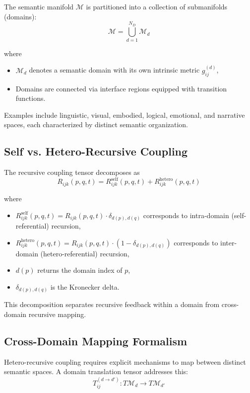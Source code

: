 The semantic manifold \(\mathcal{M}\) is partitioned into a collection of submanifolds (domains):
\begin{equation}
\mathcal{M} = \bigcup_{d=1}^{N_D} \mathcal{M}_d
\end{equation}

where
\begin{itemize}
    \item \(\mathcal{M}_d\) denotes a semantic domain with its own intrinsic metric \(g_{ij}^{(d)}\),
    \item Domains are connected via interface regions equipped with transition functions.
\end{itemize}

Examples include linguistic, visual, embodied, logical, emotional, and narrative spaces, each characterized by distinct semantic organization.

\subsection{Self vs. Hetero-Recursive Coupling}

The recursive coupling tensor decomposes as
\begin{equation}
R_{ijk}(p, q, t) = R_{ijk}^{\text{self}}(p, q, t) + R_{ijk}^{\text{hetero}}(p, q, t)
\end{equation}

where
\begin{itemize}
    \item \(R_{ijk}^{\text{self}}(p, q, t) = R_{ijk}(p, q, t) \cdot \delta_{d(p),d(q)}\) corresponds to intra-domain (self-referential) recursion,
    \item \(R_{ijk}^{\text{hetero}}(p, q, t) = R_{ijk}(p, q, t) \cdot (1 - \delta_{d(p),d(q)})\) corresponds to inter-domain (hetero-referential) recursion,
    \item \(d(p)\) returns the domain index of \(p\),
    \item \(\delta_{d(p),d(q)}\) is the Kronecker delta.
\end{itemize}

This decomposition separates recursive feedback within a domain from cross-domain recursive mapping.

\subsection{Cross-Domain Mapping Formalism}

Hetero-recursive coupling requires explicit mechanisms to map between distinct semantic spaces. A domain translation tensor addresses this:
\begin{equation}
T_{ij}^{(d \to d')} : T\mathcal{M}_d \to T\mathcal{M}_{d'}
\end{equation}


